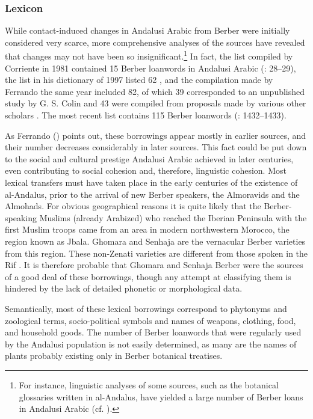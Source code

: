 \documentclass[output=paper,modfonts,nonflat]{langsci/langscibook}
\begin{document}
\subsubsection{Lexicon}

While contact-induced changes in Andalusi Arabic from Berber were initially considered very scarce, more comprehensive analyses of the sources have revealed that changes may not have been so insignificant.\footnote{For instance, linguistic analyses of some sources, such as the botanical glossaries written in al-Andalus, have yielded a large number of Berber loans in Andalusi Arabic (cf. \citealt{Abūl-Ḫayral-Išbīlī2004,Abūl-Ḫayral-Išbīlī2007,Corriente2012}).} In fact, the list compiled by Corriente in 1981 contained 15 Berber loanwords in Andalusi Arabic (\citeyear{Corriente1981}: 28–29), the list in his dictionary of 1997 listed 62 \citep[590]{Corriente1997dictionary}, and the compilation made by Ferrando the same year included 82, of which 39 corresponded to an unpublished study by G. S. Colin and 43 were compiled from proposals made by various other scholars \citep[133]{Ferrando1997}. The most recent list contains 115 Berber loanwords (\citealt{CorrientePereiraVicente2017}: 1432–1433).

As Ferrando (\citeyear[140]{Ferrando1997}) points out, these borrowings appear mostly in earlier sources, and their number decreases considerably in later sources. This fact could be put down to the social and cultural prestige Andalusi Arabic achieved in later centuries, even contributing to social cohesion and, therefore, linguistic cohesion. Most lexical transfers must have taken place in the early centuries of the existence of al-Andalus, prior to the arrival of new Berber speakers, the Almoravids and the Almohads. For obvious geographical reasons it is quite likely that the Berber-speaking Muslims (already Arabized) who reached the Iberian Peninsula with the first Muslim troops came from an area in modern northwestern Morocco, the region known as Jbala. Ghomara and Senhaja are the vernacular Berber varieties from this region. These non-Zenati varieties are different from those spoken in the Rif \citep{Kossmann2017}. It is therefore probable that Ghomara and Senhaja Berber were the sources of a good deal of these borrowings, though any attempt at classifying them is hindered by the lack of detailed phonetic or morphological data. 

Semantically, most of these lexical borrowings correspond to phytonyms and zoological terms, socio-political symbols and names of weapons, clothing, food, and household goods. The number of Berber loanwords that were regularly used by the Andalusi population is not easily determined, as many are the names of plants probably existing only in Berber botanical treatises. 
\end{document}
